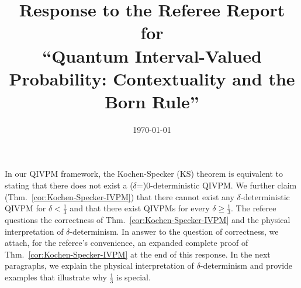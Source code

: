 \documentclass[english,reprint, aps, prl,superscriptaddress, showpacs,
showkeys, longbibliography, amsmath, amssymb, floatfix]{revtex4-1}
\theoremstyle{plain}
\theoremstyle{definition}
\begin{document}
\title{Response to the Referee Report for \\
``Quantum Interval-Valued Probability: Contextuality and the Born Rule''}
\date{\today}

\maketitle


In our QIVPM framework, the Kochen-Specker (KS) theorem is equivalent
to stating that there does not exist a ($\delta$=)$0$-deterministic
QIVPM. We further claim (Thm.~\ref{cor:Kochen-Specker-IVPM}) that
there cannot exist any $\delta$-deterministic QIVPM for
$\delta<\frac{1}{3}$ and that there exist QIVPMs for every
$\delta\ge\frac{1}{3}$.  The referee questions the correctness of
Thm.~\ref{cor:Kochen-Specker-IVPM} and the physical interpretation of
$\delta$-determinism. In answer to the question of correctness, we
attach, for the referee's convenience, an expanded complete proof of
Thm.~\ref{cor:Kochen-Specker-IVPM} at the end of this response. In the
next paragraphs, we explain the physical interpretation of
$\delta$-determinism and provide examples that illustrate why
$\frac{1}{3}$ is special.

\end{document}
